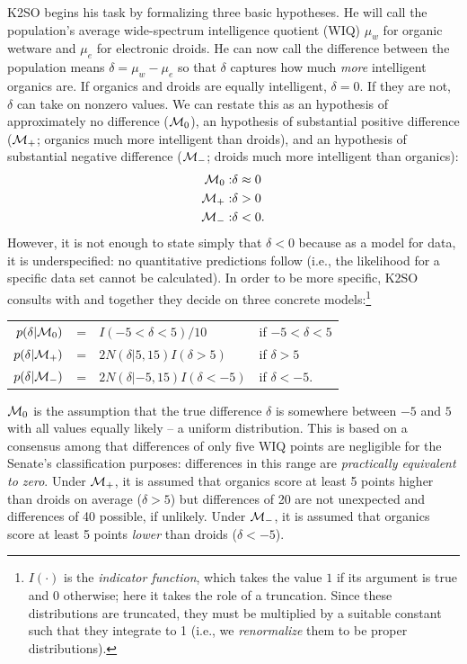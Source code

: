 K2SO begins his task by formalizing three basic hypotheses. He will call the population's average wide-spectrum intelligence quotient (WIQ) $\mu_w$ for organic wetware and $\mu_e$ for electronic droids. He can now call the difference between the population means $\delta = \mu_w - \mu_e$ so that $\delta$ captures how much \emph{more} intelligent organics are. If organics and droids are equally intelligent, $\delta=0$. If they are not, $\delta$ can take on nonzero values. We can restate this as an hypothesis of approximately no difference (${\cal M}_0$), an hypothesis of substantial positive difference (${\cal M}_+$; organics much more intelligent than droids), and an hypothesis of substantial negative difference (${\cal M}_-$; droids much more intelligent than organics):
\begin{eqnarray*}
  {\cal M}_0: & \delta \approx 0\\
  {\cal M}_+: & \delta >       0\\
  {\cal M}_-: & \delta <       0.
\end{eqnarray*}
However, it is not enough to state simply that $\delta < 0$ because as a model for data, it is underspecified: no quantitative predictions follow (i.e., the likelihood for a specific data set cannot be calculated). In order to be more specific, K2SO consults with \cogs{} and together they decide on three concrete models:\footnote{$I(\cdot)$ is the \emph{indicator function}, which takes the value $1$ if its argument is true and $0$ otherwise; here it takes the role of a truncation. Since these distributions are truncated, they must be multiplied by a suitable constant such that they integrate to 1 (i.e., we \textit{renormalize} them to be proper distributions).}
\begin{center}\begin{tabular}{rrll}
  $p(\delta|{\cal M}_0)$ &=& $I(-5 < \delta < 5)/10$         & { if }$-5 < \delta < 5$\\
  $p(\delta|{\cal M}_+)$ &=& $2N(\delta|5,15)I(\delta>5)$    & { if }$\delta > 5$\\
  $p(\delta|{\cal M}_-)$ &=& $2N(\delta|-5,15)I(\delta< -5)$ & { if }$\delta < -5$.
\end{tabular}\end{center}
${\cal M}_0$ is the assumption that the true difference $\delta$ is somewhere between $-5$ and $5$ with all values equally likely -- a uniform distribution. This is based on a consensus among \cogs{} that differences of only five WIQ points are negligible for the Senate's classification purposes: differences in this range are \emph{practically equivalent to zero}. Under ${\cal M}_+$, it is assumed that organics score at least 5 points higher than droids on average ($\delta > 5$) but differences of 20 are not unexpected and differences of 40 possible, if unlikely. Under ${\cal M}_-$, it is assumed that organics score at least 5 points \emph{lower} than droids ($\delta < -5$).


